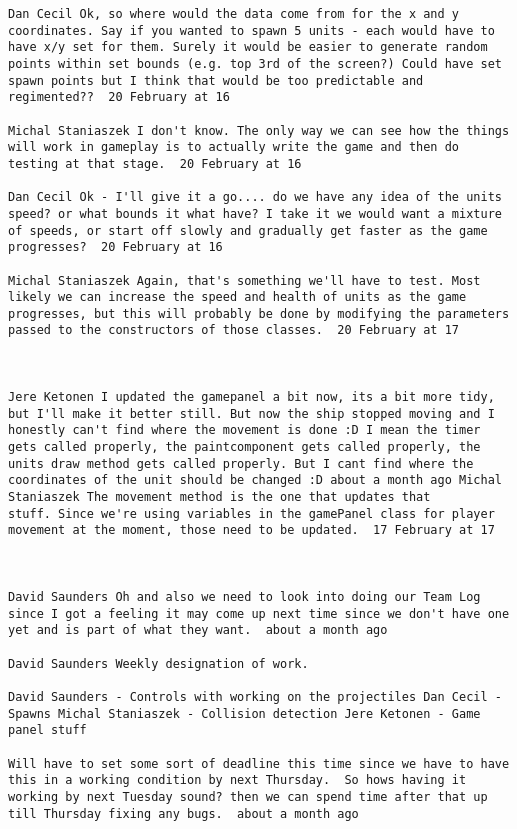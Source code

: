 \begin{verbatim}
Dan Cecil Ok, so where would the data come from for the x and y
coordinates. Say if you wanted to spawn 5 units - each would have to
have x/y set for them. Surely it would be easier to generate random
points within set bounds (e.g. top 3rd of the screen?) Could have set
spawn points but I think that would be too predictable and
regimented??  20 February at 16

Michal Staniaszek I don't know. The only way we can see how the things
will work in gameplay is to actually write the game and then do
testing at that stage.  20 February at 16

Dan Cecil Ok - I'll give it a go.... do we have any idea of the units
speed? or what bounds it what have? I take it we would want a mixture
of speeds, or start off slowly and gradually get faster as the game
progresses?  20 February at 16

Michal Staniaszek Again, that's something we'll have to test. Most
likely we can increase the speed and health of units as the game
progresses, but this will probably be done by modifying the parameters
passed to the constructors of those classes.  20 February at 17



Jere Ketonen I updated the gamepanel a bit now, its a bit more tidy,
but I'll make it better still. But now the ship stopped moving and I
honestly can't find where the movement is done :D I mean the timer
gets called properly, the paintcomponent gets called properly, the
units draw method gets called properly. But I cant find where the
coordinates of the unit should be changed :D about a month ago Michal
Staniaszek The movement method is the one that updates that
stuff. Since we're using variables in the gamePanel class for player
movement at the moment, those need to be updated.  17 February at 17



David Saunders Oh and also we need to look into doing our Team Log
since I got a feeling it may come up next time since we don't have one
yet and is part of what they want.  about a month ago

David Saunders Weekly designation of work.

David Saunders - Controls with working on the projectiles Dan Cecil -
Spawns Michal Staniaszek - Collision detection Jere Ketonen - Game
panel stuff

Will have to set some sort of deadline this time since we have to have
this in a working condition by next Thursday.  So hows having it
working by next Tuesday sound? then we can spend time after that up
till Thursday fixing any bugs.  about a month ago


\end{verbatim}
